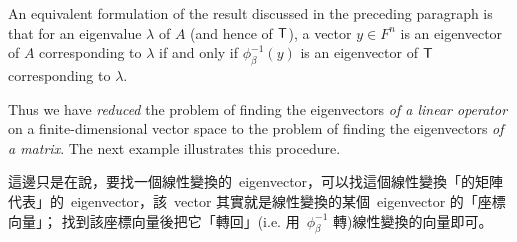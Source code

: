 \begin{remark}
An equivalent formulation of the result discussed in the preceding paragraph is that for an eigenvalue \(\lambda\) of \(A\) (and hence of \(\textsf{T}\)),
a vector \(y \in F^n\) is an eigenvector of \(A\) corresponding to \(\lambda\) if and only if \(\phi_{\beta}^{-1}(y)\) is an eigenvector of \(\textsf{T}\) corresponding to \(\lambda\).

Thus we have \emph{reduced} the problem of finding the eigenvectors \emph{of a linear operator} on a finite-dimensional vector space to the problem of finding the
eigenvectors \emph{of a matrix}.
The next example illustrates this procedure.
\end{remark}

\begin{note}
這邊只是在說，要找一個線性變換的\ eigenvector，可以找這個線性變換「的矩陣代表」的\ eigenvector，該\ vector 其實就是線性變換的某個\ eigenvector 的「座標向量」；
找到該座標向量後把它「轉回」(i.e. 用\ \(\phi_{\beta}^{-1}\) 轉)線性變換的向量即可。
\end{note}


